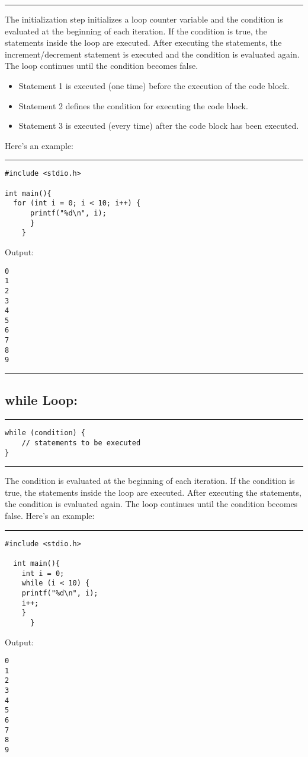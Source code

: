 \documentclass[a4paper]{article}
\begin{document}
\noindent\rule{\textwidth}{0.5pt}
The initialization step initializes a loop counter variable and the condition is
evaluated at the beginning of each iteration. If the condition is true, the
statements inside the loop are executed. After executing the statements, the
increment/decrement statement is executed and the condition is evaluated
again. The loop continues until the condition becomes false.

\begin{itemize}
\item Statement 1 is executed (one time) before the execution of the code block.
\item Statement 2 defines the condition for executing the code block.
\item Statement 3 is executed (every time) after the code block has been executed.
\end{itemize}

Here's an example:

\noindent\rule{\textwidth}{0.5pt}
\begin{verbatim}
#include <stdio.h>

int main(){
  for (int i = 0; i < 10; i++) {
      printf("%d\n", i);
      }
    }
\end{verbatim}
Output:
\begin{verbatim}
0
1
2
3
4
5
6
7
8
9
\end{verbatim}

\noindent\rule{\textwidth}{0.5pt}

\subsection{while Loop:}
\label{sec:org987268a}
\noindent\rule{\textwidth}{0.5pt}
\begin{verbatim}
while (condition) {
    // statements to be executed
}
\end{verbatim}

\noindent\rule{\textwidth}{0.5pt}
The condition is evaluated at the beginning of each iteration. If the condition
is true, the statements inside the loop are executed. After executing the
statements, the condition is evaluated again. The loop continues until the
condition becomes false.
Here's an example:

\noindent\rule{\textwidth}{0.5pt}
\begin{verbatim}
#include <stdio.h>

  int main(){
	int i = 0;
	while (i < 10) {
	printf("%d\n", i);
	i++;
    }
      }
\end{verbatim}
Output:
\begin{verbatim}
0
1
2
3
4
5
6
7
8
9
\end{verbatim}
\end{document}
